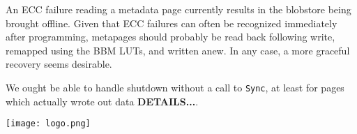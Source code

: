 \documentclass[letterpaper,10pt]{article}
\begin{document}
An ECC failure reading a metadata page currently results in the blobstore being
brought offline. Given that ECC failures can often be recognized immediately
after programming, metapages should probably be read back following write,
remapped using the BBM LUTs, and written anew. In any case, a more graceful
recovery seems desirable.

We ought be able to handle shutdown without a call to \texttt{Sync}, at least
for pages which actually wrote out data \textbf{DETAILS...}.

\printbibliography

\begin{center}
\texttt{[image: logo.png]}
\end{center}
\end{document}
